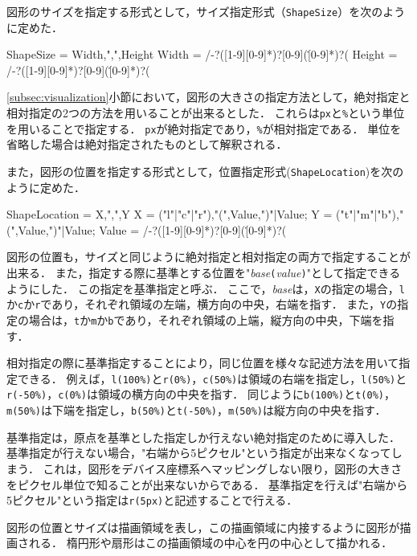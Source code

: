 図形のサイズを指定する形式として，サイズ指定形式（{\tt ShapeSize}）を次のように定めた．

\begin{EBNF}
ShapeSize = Width,",",Height
Width = /-?([1-9][0-9]*)?[0-9](\.[0-9]*)?(%
Height = /-?([1-9][0-9]*)?[0-9](\.[0-9]*)?(%
\end{EBNF}

\ref{subsec:visualization}小節において，図形の大きさの指定方法として，絶対指定と相対指定の2つの方法を用いることが出来るとした．
これらは{\tt px}と{\tt \%}という単位を用いることで指定する．
{\tt px}が絶対指定であり，{\tt \%}が相対指定である．
単位を省略した場合は絶対指定されたものとして解釈される．

また，図形の位置を指定する形式として，位置指定形式({\tt ShapeLocation})を次のように定めた．

\begin{EBNF}
ShapeLocation = X,",",Y
X = ("l"|"c"|"r"),"(",Value,")"|Value;
Y = ("t"|"m"|"b"),"(",Value,")"|Value;
Value = /-?([1-9][0-9]*)?[0-9](\.[0-9]*)?(%
\end{EBNF}

図形の位置も，サイズと同じように絶対指定と相対指定の両方で指定することが出来る．
また，指定する際に基準とする位置を"{\it base}\verb|(|{\it value}\verb|)|"として指定できるようにした．
この指定を基準指定と呼ぶ．
ここで，{\it base}は，{\tt X}の指定の場合，{\tt l}か{\tt c}か{\tt r}であり，それぞれ領域の左端，横方向の中央，右端を指す．
また，{\tt Y}の指定の場合は，{\tt t}か{\tt m}か{\tt b}であり，それぞれ領域の上端，縦方向の中央，下端を指す．

相対指定の際に基準指定することにより，同じ位置を様々な記述方法を用いて指定できる．
例えば，{\tt l(100\%)}と{\tt r(0\%)}，{\tt c(50\%)}は領域の右端を指定し，{\tt l(50\%)}と{\tt r(-50\%)}，{\tt c(0\%)}は領域の横方向の中央を指す．
同じように{\tt b(100\%)}と{\tt t(0\%)}，{\tt m(50\%)}は下端を指定し，{\tt b(50\%)}と{\tt t(-50\%)}，{\tt m(50\%)}は縦方向の中央を指す．

基準指定は，原点を基準とした指定しか行えない絶対指定のために導入した．
基準指定が行えない場合，"右端から5ピクセル"という指定が出来なくなってしまう．
これは，図形をデバイス座標系へマッピングしない限り，図形の大きさをピクセル単位で知ることが出来ないからである．
基準指定を行えば"右端から5ピクセル"という指定は{\tt r(5px)}と記述することで行える．

図形の位置とサイズは描画領域を表し，この描画領域に内接するように図形が描画される．
楕円形や扇形はこの描画領域の中心を円の中心として描かれる．

